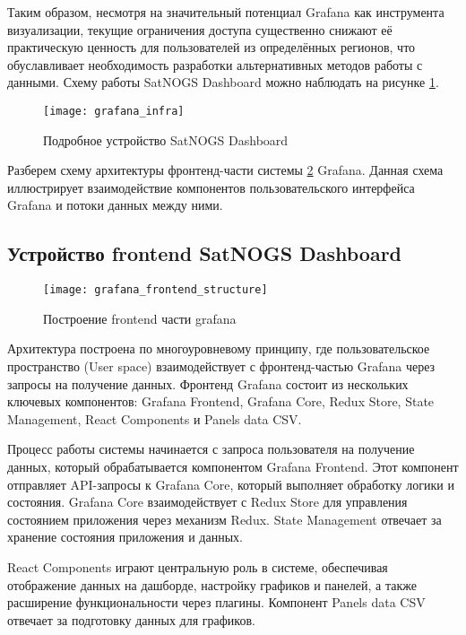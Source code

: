 Таким образом, несмотря на значительный потенциал Grafana как инструмента
визуализации, текущие ограничения доступа существенно снижают её практическую
ценность для пользователей из определённых регионов, что обуславливает
необходимость разработки альтернативных методов работы с данными.
Схему работы SatNOGS Dashboard можно наблюдать на рисунке
\ref{fig:grafana_infra}.

\begin{figure}[H]
	\centering
	\texttt{[image: grafana\_infra]}
	\caption{Подробное устройство SatNOGS Dashboard}
	\label{fig:grafana_infra}
\end{figure}


Разберем схему архитектуры фронтенд-части системы
\ref{fig:grafana_frontend_structure}
Grafana.
Данная схема иллюстрирует взаимодействие компонентов пользовательского
интерфейса Grafana и потоки данных между ними.

\subsection{Устройство frontend SatNOGS Dashboard}
\begin{figure}[htbp]
	\centering
	\texttt{[image: grafana\_frontend\_structure]}
	\caption{Построение frontend части grafana \cite{react_managing_state}}
	\label{fig:grafana_frontend_structure}
\end{figure}

Архитектура построена по многоуровневому принципу, где пользовательское
пространство (User space) взаимодействует с фронтенд-частью Grafana через
запросы на получение данных. Фронтенд Grafana состоит из нескольких ключевых
компонентов: Grafana Frontend, Grafana Core, Redux Store, State Management,
React Components и Panels data CSV.

Процесс работы системы начинается с запроса пользователя на получение данных,
который обрабатывается компонентом Grafana Frontend. Этот компонент отправляет
API-запросы к Grafana Core, который выполняет обработку логики и состояния.
Grafana Core взаимодействует с Redux Store для управления состоянием приложения
через механизм Redux. State Management отвечает за хранение состояния
приложения и данных.

React Components играют центральную роль в системе, обеспечивая отображение
данных на дашборде, настройку графиков и панелей, а также расширение
функциональности через плагины. Компонент Panels data CSV отвечает за
подготовку данных для графиков.

